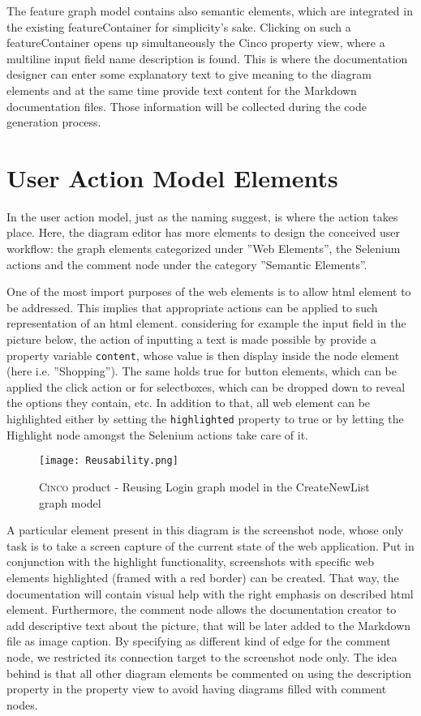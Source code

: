 The feature graph model contains also semantic elements, which are integrated in the existing featureContainer for simplicity's sake. Clicking on such a featureContainer opens up simultaneously the Cinco property view, where a multiline input field name description is found. This is where the documentation designer can enter some explanatory text to give meaning to the diagram elements and at the same time provide text content for the Markdown documentation files. Those information will be collected during the code generation process.

\section{User Action Model Elements}\label{sec:DocModElem}

In the user action model, just as the naming suggest, is where the action takes place. Here, the diagram editor has more elements to design the conceived user workflow: the graph elements categorized under ''Web Elements'', the Selenium actions and the comment node under the category ''Semantic Elements''.

One of the most import purposes of the web elements is to allow \acrshort{html} element to be addressed. This implies that appropriate actions can be applied to such representation of an \acrshort{html} element. considering for example the input field in the picture below, the action of inputting a text is made possible by provide a property variable \lstinline{content}, whose value is then display inside the node element (here i.e. ''Shopping''). The same holds true for button elements, which can be applied the click action or for selectboxes, which can be dropped down to reveal the options they contain, etc. In addition to that, all web element can be highlighted either by setting the \lstinline{highlighted} property to true or by letting the Highlight node amongst the Selenium actions take care of it.

\begin{figure}[h]
    \centering
    \texttt{[image: Reusability.png]}
    \caption{\textsc{Cinco} product - Reusing Login graph model in the CreateNewList graph model}
    \label{fig:reusability}
\end{figure}

A particular element present in this diagram is the screenshot node, whose only task is to take a screen capture of the current state of the web application. Put in conjunction with the highlight functionality, screenshots with specific web elements highlighted (framed with a red border) can be created. That way, the documentation will contain visual help with the right emphasis on described \acrshort{html} element. Furthermore, the comment node allows the documentation creator to add descriptive text about the picture, that will be later added to the Markdown file as image caption. By specifying as different kind of edge for the comment node, we restricted its connection target to the screenshot node only. The idea behind is that all other diagram elements be commented on using the description property in the property view to avoid having diagrams filled with comment nodes.

